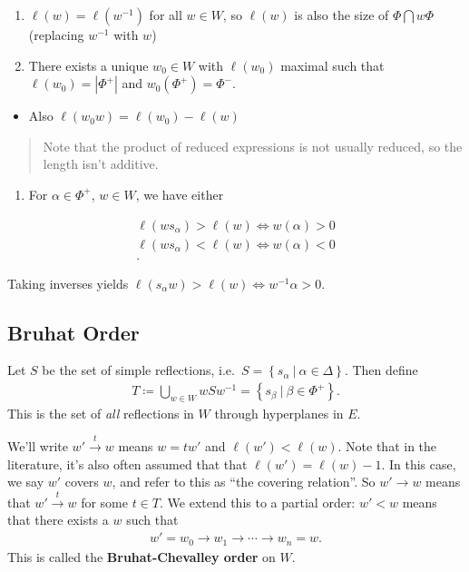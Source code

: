 \documentclass[11pt]{scrartcl}
\theoremstyle{definition}
\theoremstyle{theorem}
\theoremstyle{proof}
\theoremstyle{definition}
\theoremstyle{break}
\theoremstyle{problem}
\providecommand{\tightlist}{%
  \setlength{\itemsep}{0pt}\setlength{\parskip}{0pt}}
\newcommand{\abs}[1]{{\left\lvert {#1} \right\rvert}}
\newcommand{\definedas}[0]{\coloneqq}
\newcommand{\intersect}[0]{\bigcap}
\newcommand{\inv}[0]{^{-1}}
\newcommand{\mapsvia}[1]{\xrightarrow{#1}}
\newcommand{\suchthat}[0]{{~\mathrel{\Big|}~}}
\newcommand{\theset}[1]{\left\{{#1}\right\}}
\newcommand{\union}[0]{\bigcup}
\renewcommand{\to}[0]{\longrightarrow}
\begin{document}
\begin{enumerate}
\def\labelenumi{\arabic{enumi}.}
\setcounter{enumi}{1}
\item
  \(\ell(w) = \ell(w\inv)\) for all \(w\in W\), so \(\ell(w)\) is also
  the size of \(\Phi \intersect w\Phi\) (replacing \(w\inv\) with \(w\))
\item
  There exists a unique \(w_0 \in W\) with \(\ell(w_0)\) maximal such
  that \(\ell(w_0) = \abs{\Phi^+}\) and \(w_0(\Phi^+) = \Phi^-\).
\end{enumerate}

\begin{itemize}
\tightlist
\item
  Also \(\ell(w_0 w) = \ell(w_0) - \ell(w)\)
\end{itemize}

\begin{quote}
Note that the product of reduced expressions is not usually reduced, so
the length isn't additive.
\end{quote}

\begin{enumerate}
\def\labelenumi{\arabic{enumi}.}
\setcounter{enumi}{3}
\tightlist
\item
  For \(\alpha \in \Phi^+\), \(w\in W\), we have either
\end{enumerate}

\begin{align*}
\ell(w s_\alpha) > \ell (w) \iff w(\alpha) > 0 \\
\ell(w s_\alpha) < \ell (w) \iff w(\alpha) < 0 \\
.\end{align*}

Taking inverses yields
\(\ell(s_\alpha w) > \ell(w) \iff w\inv\alpha > 0\).

\hypertarget{bruhat-order}{%
\subsection{Bruhat Order}\label{bruhat-order}}

Let \(S\) be the set of simple reflections,
i.e.~\(S = \theset{s_\alpha \suchthat \alpha \in \Delta}\). Then define
\begin{align*}
T \definedas \union_{w\in W} wSw\inv = \theset{s_\beta \suchthat \beta\in\Phi^+}
.\end{align*} This is the set of \emph{all} reflections in \(W\) through
hyperplanes in \(E\).

We'll write \(w' \mapsvia{t} w\) means \(w=tw'\) and
\(\ell(w') < \ell(w)\). Note that in the literature, it's also often
assumed that that \(\ell(w') = \ell(w) - 1\). In this case, we say
\(w'\) covers \(w\), and refer to this as ``the covering relation''. So
\(w' \to w\) means that \(w' \mapsvia{t} w\) for some \(t\in T\). We
extend this to a partial order: \(w' < w\) means that there exists a
\(w\) such that
\begin{align*}
w' = w_0 \to w_1 \to \cdots \to w_n = w.
\end{align*} This is called the \textbf{Bruhat-Chevalley order} on
\(W\).
\end{document}
